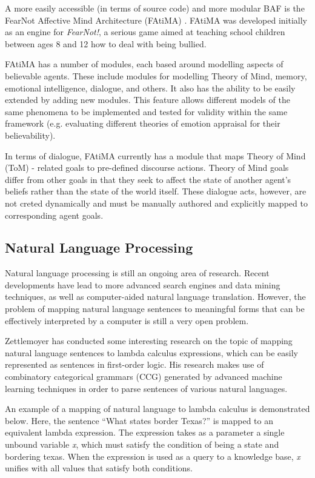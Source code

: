 \documentclass{article}
\begin{document}
A more easily accessible (in terms of source code) and more modular
BAF is the FearNot Affective Mind Architecture (FAtiMA)
\cite{Mascarenhas}.  FAtiMA was developed initially as an engine for
\emph{FearNot!}\cite{Ecircus}, a serious game aimed at
teaching school children between ages 8 and 12 how to deal with being
bullied.

FAtiMA has a number of modules, each based around modelling aspects of
believable agents.  These include modules for modelling Theory of
Mind\cite{Marsella}, memory, emotional intelligence, dialogue, and
others.  It also has the ability to be easily extended by adding new
modules.  This feature allows different models of the same phenomena
to be implemented and tested for validity within the same framework
(e.g. evaluating different theories of emotion appraisal for their
believability).

In terms of dialogue, FAtiMA currently has a module that maps Theory
of Mind (ToM) - related goals to pre-defined discourse actions.  Theory of
Mind goals differ from other goals in that they seek to affect the
state of another agent's beliefs rather than the state of the world
itself.  These dialogue acts, however, are not creted dynamically and
must be manually authored and explicitly mapped to corresponding agent
goals.


\subsection{Natural Language Processing}

Natural language processing is still an ongoing area of research.  Recent
developments have lead to more advanced search engines and data mining 
techniques, as well as computer-aided natural language translation.  However,
the problem of mapping natural language sentences to meaningful forms that can
be effectively interpreted by a computer is still a very open problem.

Zettlemoyer \cite{Zettlemoyer2004} has conducted some interesting research
on the topic of mapping natural language sentences to lambda calculus
expressions, which can be easily represented as sentences in
first-order logic.  His research makes use of combinatory categorical
grammars (CCG) \cite{Steedman2003} generated by advanced machine
learning techniques in order to parse sentences of various natural
languages.

An example of a mapping of natural language to lambda calculus is
demonstrated below.  Here, the sentence ``What states border Texas?''
is mapped to an equivalent lambda expression.  The expression takes as
a parameter a single unbound variable \emph{x}, which must satisfy the
condition of being a state and bordering texas.  When the expression
is used as a query to a knowledge base, \emph{x} unifies with all
values that satisfy both conditions.
\end{document}
